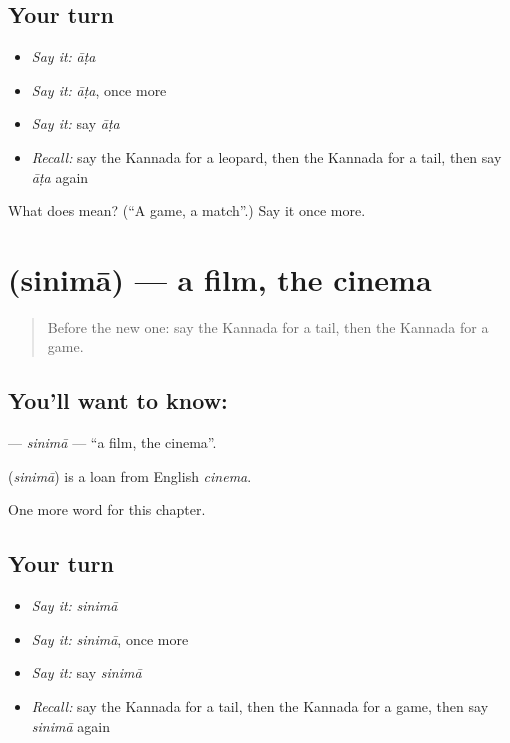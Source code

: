 \subsection*{Your turn}
\begin{itemize}
\raggedright
  \item \emph{Say it:} \emph{āṭa}
  \item \emph{Say it:} \emph{āṭa}, once more
  \item \emph{Say it:} say \emph{āṭa}
  \item \emph{Recall:} say the Kannada for a leopard, then the Kannada for a tail, then say \emph{āṭa} again
\end{itemize}

\begin{tcolorbox}[breakable,colback=teal!4,colframe=teal!35!black,title={Before you move on}]
What does  mean? (\textquotedblleft{}A game, a match\textquotedblright{}.) Say it once more.
\end{tcolorbox}
\section[\texorpdfstring{\kn{ಸಿನಿಮಾ} (sinimā)}{ಸಿನಿಮಾ (sinimā)}]{ (sinimā) — a film, the cinema}

\label{lesson:KA-C298-sinima}



\begin{quote}
Before the new one: say the Kannada for a tail, then the Kannada for a game.
\end{quote}

\subsection*{You'll want to know: }
\textbf{} — \emph{sinimā} — \textquotedblleft{}a film, the cinema\textquotedblright{}.

\begin{cousinweb}
\textbf{} (\emph{sinimā}) is a loan from English \emph{cinema}.
\end{cousinweb}

\begin{grammarlens}[title={What you've built}]
One more word for this chapter.
\end{grammarlens}

\subsection*{Your turn}
\begin{itemize}
\raggedright
  \item \emph{Say it:} \emph{sinimā}
  \item \emph{Say it:} \emph{sinimā}, once more
  \item \emph{Say it:} say \emph{sinimā}
  \item \emph{Recall:} say the Kannada for a tail, then the Kannada for a game, then say \emph{sinimā} again
\end{itemize}

